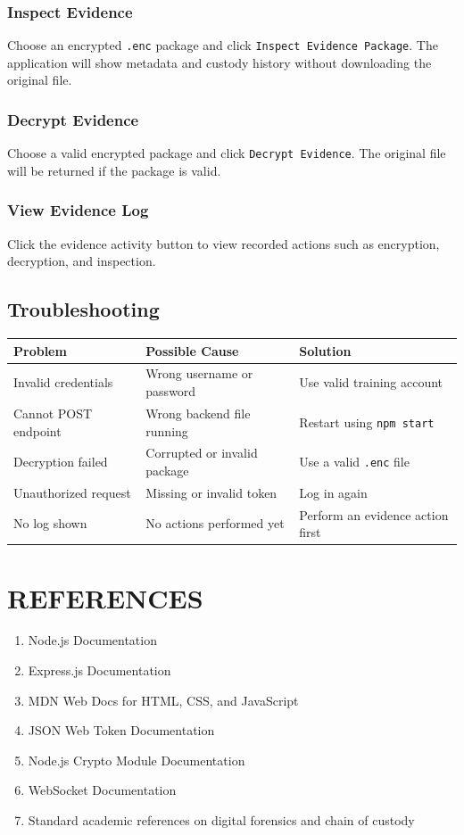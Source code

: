 \documentclass[12pt,a4paper]{report}
\begin{document}
\subsection{Inspect Evidence}
Choose an encrypted \texttt{.enc} package and click \texttt{Inspect Evidence Package}. The application will show metadata and custody history without downloading the original file.

\subsection{Decrypt Evidence}
Choose a valid encrypted package and click \texttt{Decrypt Evidence}. The original file will be returned if the package is valid.

\subsection{View Evidence Log}
Click the evidence activity button to view recorded actions such as encryption, decryption, and inspection.

\section{Troubleshooting}

\begin{longtable}{|p{2in}|p{1.8in}|p{2in}|}
\hline
\textbf{Problem} & \textbf{Possible Cause} & \textbf{Solution} \\ \hline
Invalid credentials & Wrong username or password & Use valid training account \\ \hline
Cannot POST endpoint & Wrong backend file running & Restart using \texttt{npm start} \\ \hline
Decryption failed & Corrupted or invalid package & Use a valid \texttt{.enc} file \\ \hline
Unauthorized request & Missing or invalid token & Log in again \\ \hline
No log shown & No actions performed yet & Perform an evidence action first \\ \hline
\end{longtable}

\chapter*{REFERENCES}

\begin{enumerate}
\item Node.js Documentation
\item Express.js Documentation
\item MDN Web Docs for HTML, CSS, and JavaScript
\item JSON Web Token Documentation
\item Node.js Crypto Module Documentation
\item WebSocket Documentation
\item Standard academic references on digital forensics and chain of custody
\end{enumerate}
\end{document}
